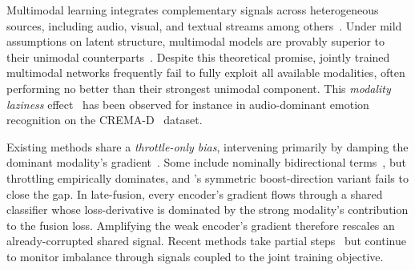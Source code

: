 \documentclass{article}
\begin{document}

Multimodal learning integrates complementary signals across heterogeneous sources, including audio, visual, and textual streams among others~\citep{baltrusaitis2019multimodal}. Under mild assumptions on latent structure, multimodal models are provably superior to their unimodal counterparts~\citep{huang2021multimodal}. Despite this theoretical promise, jointly trained multimodal networks frequently fail to fully exploit all available modalities, often performing no better than their strongest unimodal component. This \emph{modality laziness} effect~\citep{wang2020gblending,peng2022ogmge,du2023suppression} has been observed for instance in audio-dominant emotion recognition on the CREMA-D~\citep{cao2014cremad} dataset.


Existing methods share a \emph{throttle-only bias}, intervening primarily by damping the dominant modality's gradient~\citep{peng2022ogmge,wei2024mmpareto,guo2024cggm,wei2024opm,fan2023pmr,kontras2024mlgm}. Some include nominally bidirectional terms~\citep{li2023agm,gao2025arm,huang2025inforeg,wei2025improving}, but throttling empirically dominates, and \citet{wei2024opm}'s symmetric boost-direction variant fails to close the gap. In late-fusion, every encoder's gradient flows through a shared classifier whose loss-derivative is dominated by the strong modality's contribution to the fusion loss. Amplifying the weak encoder's gradient therefore rescales an already-corrupted shared signal. Recent methods take partial steps~\citep{yang2025iprm,jiang2025aug} but continue to monitor imbalance through signals coupled to the joint training objective.

\end{document}
